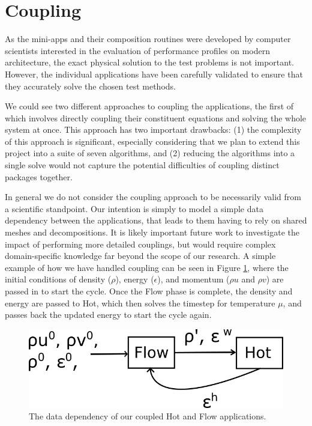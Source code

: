 \documentclass[runningheads,a4paper]{llncs}
\begin{document}
\section{Coupling}

As the mini-apps and their composition routines were developed by computer scientists interested in the evaluation of performance profiles on modern architecture, the exact physical solution to the test problems is not important. However, the individual applications have been carefully validated to ensure that they accurately solve the chosen test methods.

We could see two different approaches to coupling the applications, the first of which involves directly coupling their constituent equations and solving the whole system at once. This approach has two important drawbacks: (1) the complexity of this approach is significant, especially considering that we plan to extend this project into a suite of seven algorithms, and (2) reducing the algorithms into a single solve would not capture the potential difficulties of coupling distinct packages together.

In general we do not consider the coupling approach to be necessarily valid from a scientific standpoint. Our intention is simply to model a simple data dependency between the applications, that leads to them having to rely on shared meshes and decompositions. It is likely important future work to investigate the impact of performing more detailed couplings, but would require complex domain-specific knowledge far beyond the scope of our research. A simple example of how we have handled coupling can be seen in Figure \ref{fig:hot-flow-flow}, where the initial conditions of density ($\rho$), energy ($\epsilon$), and momentum ($\rho u$ and $\rho v$) are passed in to start the cycle. Once the Flow phase is complete, the density and energy are passed to Hot, which then solves the timestep for temperature $\mu$, and passes back the updated energy to start the cycle again.

\begin{figure}
  \centering
  \includegraphics[width=0.6\linewidth]{hot-flow-flow}
  \caption{The data dependency of our coupled Hot and Flow applications.}
  \label{fig:hot-flow-flow}
\end{figure}
\end{document}
